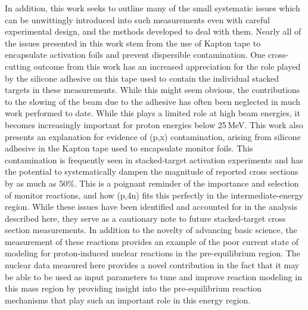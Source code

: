 In addition, this work seeks to outline many of the small systematic issues which can be unwittingly introduced into such measurements even with careful experimental design, and the methods developed to deal with them.
Nearly all of the issues presented in this work stem from the use of Kapton tape to encapsulate activation foils and prevent dispersible contamination.
One cross-cutting outcome from this work has an increased appreciation for the role played by the silicone adhesive on this tape used to contain the individual stacked targets in these measurements. 
While this might seem obvious, the contributions to the slowing of the beam due to the adhesive has often been neglected in much work performed to date. 
While this plays a limited role at high beam energies, it becomes increasingly important for proton energies below 25\,MeV. 
This work also presents an explanation for evidence of (p,x) contamination, arising from silicone adhesive in the Kapton tape used to encapsulate monitor foils. 
This contamination is frequently seen in stacked-target activation experiments and has the potential to systematically dampen the magnitude of reported cross sections by as much as 50\%. 
This is a poignant reminder of the importance and selection of monitor reactions, and how (p,4n) fits this perfectly in the intermediate-energy region.
While these issues have been identified and accounted for in the analysis described here, they serve as a cautionary note to future stacked-target cross section measurements.
In addition to the novelty of advancing basic science, the measurement of these reactions provides an example of the poor current state of modeling for proton-induced nuclear reactions in the pre-equilibrium region.
The nuclear data measured here provides a novel contribution in the fact that it may be able to be used as input parameters to tune and improve reaction modeling in this mass region by providing insight into the pre-equilibrium reaction mechanisms that play such an important role in this energy region.





